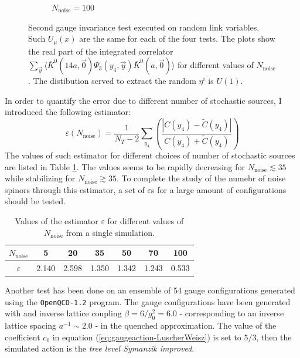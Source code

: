 \documentclass[english, LaM, oneside, noexaminfo]{sapthesis}
\newcommand{\la}{\langle}
\newcommand{\ra}{\rangle}
\newcommand{\gev}{\text{ GeV}}
\begin{document}
\begin{figure}[h!]
\begin{subfigure}[b]{0.49\textwidth}
        \caption{$N_\text{noise}=100$}
    \end{subfigure}
    \caption{Second gauge invariance test executed on random link variables. Such $U_\mu(x)$ are the same for each of the four tests.
        The plots show the real part of the integrated correlator $\sum_{\vec y} \la \bar K^0 (14a,\vec 0) \Psi_3 (y_4, \vec y) \bar K^0 (a,\vec 0) \ra$ for different values of $N_\text{noise}$.
        The distibution served to extract the random $\eta^i$ is $U(1)$.}
    \label{fig:check2}
\end{figure}
In order to quantify the error due to different number of stochastic sources, I introduced the following estimator:
\begin{equation*}
    \varepsilon(N_\text{noise}) = \frac{1}{N_T-2}\sum_{y_4}\left(\frac{|C(y_4)-\tilde C(y_4)|}{C(y_4)+\tilde C(y_4)}\right)
\end{equation*}
The values of such estimator for different choices of number of stochastic sources are listed in Table \ref{tab:estimator}.
The values seems to be rapidly decreasing for $N_\text{noise} \lesssim 35$ while stabilizing for $N_\text{noise} \gtrsim 35$.
To complete the study of the numebr of noise spinors through this estimator, a set of $\varepsilon$s for a large amount of configurations should be tested.
\begin{table}[h!]
    \centering
    \begin{tabular}{|c||c|c|c|c|c|c|}
        \hline
        $N_\text{noise}$ & 5 & 20 & 35 & 50 & 70 & 100 \\
        \hline
        $\varepsilon$ & 2.140 & 2.598 & 1.350 & 1.342 & 1.243 & 0.533 \\ 
        \hline
  \end{tabular}
  \vspace*{3mm}
  \caption{Values of the estimator $\varepsilon$ for different values of $N_\text{noise}$ from a single simulation.}
  \label{tab:estimator}
\end{table}
\newline
Another test has been done on an ensemble of 54 gauge configurations generated using the \texttt{OpenQCD-1.2} program.
The gauge configurations have been generated with and inverse lattice coupling $\beta = 6/g_0^2 = 6.0$ - corresponding to an inverse lattice spacing $a^{-1} \sim 2.0$ \gev \cite{exploring-tmQCD-clover-term} - in the quenched approximation.
The value of the coefficient $c_0$ in equation (\ref{eq:gaugeaction-LuscherWeisz}) is set to $5/3$, then the simulated action is the {\it tree level Symanzik improved}.
\end{document}
